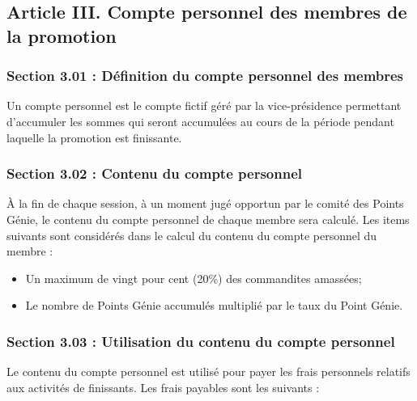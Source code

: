 \subsection*{Article III. Compte personnel des membres de la promotion}

\subsubsection*{Section 3.01 : Définition du compte personnel des membres}
Un compte personnel est le compte fictif géré par la vice-présidence permettant d’accumuler les sommes qui seront accumulées au cours de la période pendant laquelle la promotion est finissante.

\subsubsection*{Section 3.02 : Contenu du compte personnel}
À la fin de chaque session, à un moment jugé opportun par le comité des Points Génie, le contenu du compte personnel de chaque membre sera calculé. Les items suivants sont considérés dans le calcul du contenu du compte personnel du membre :
\begin{itemize}
\item Un maximum de vingt pour cent (20\%) des commandites amassées;
\item Le nombre de Points Génie accumulés multiplié par le taux du Point Génie.
\end{itemize}

\subsubsection*{Section 3.03 : Utilisation du contenu du compte personnel}
Le contenu du compte personnel est utilisé pour payer les frais personnels relatifs aux activités de finissants. Les frais payables sont les suivants :

